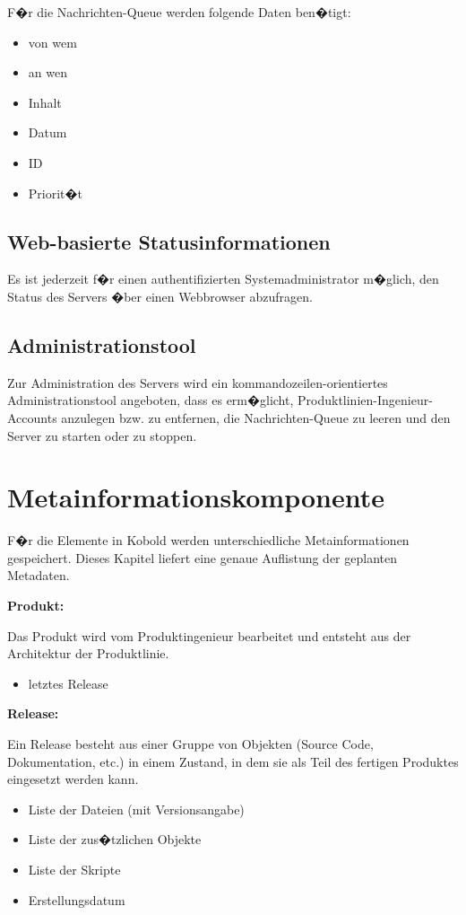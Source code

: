 F�r die Nachrichten-Queue werden folgende Daten ben�tigt:
\begin{itemize}
\item von wem
\item an wen
\item Inhalt
\item Datum
\item ID
\item Priorit�t
\end{itemize}



\subsection{Web-basierte Statusinformationen}

Es ist jederzeit f�r einen authentifizierten Systemadministrator m�glich,
den Status des Servers �ber einen Webbrowser abzufragen.

\subsection{Administrationstool}

Zur Administration des Servers wird ein kommandozeilen-orientiertes 
Administrationstool angeboten, dass es erm�glicht, Produktlinien-Ingenieur-Accounts
anzulegen bzw. zu entfernen, die Nachrichten-Queue zu
leeren und den Server zu starten oder zu stoppen.


\section{Metainformationskomponente}

F�r die Elemente in Kobold werden unterschiedliche Metainformationen gespeichert. Dieses Kapitel liefert eine genaue Auflistung der geplanten Metadaten.\newline

\textbf{Produkt:}\par
Das Produkt wird vom Produktingenieur bearbeitet und entsteht aus der Architektur der Produktlinie. 
\begin{itemize}
\item letztes Release\newline
\end{itemize}

\textbf{Release:}\par
Ein Release besteht aus einer Gruppe von Objekten (Source Code, Dokumentation, etc.) in einem Zustand, in dem sie als Teil des fertigen Produktes eingesetzt werden kann.
\begin{itemize}
\item Liste der Dateien (mit Versionsangabe)
\item Liste der zus�tzlichen Objekte
\item Liste der Skripte
\item Erstellungsdatum\newline
\end{itemize}

